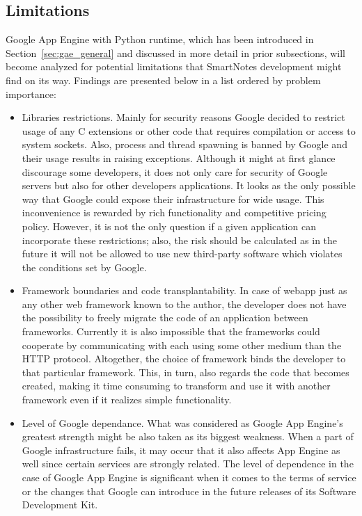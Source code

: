 \subsection{Limitations}\label{subsec:limitations}
Google App Engine with Python runtime, which has been introduced in Section~\ref{sec:gae_general} and discussed in more detail in prior subsections, will become analyzed for potential limitations that SmartNotes development might find on its way. Findings are presented below in a list ordered by problem importance:
\begin{itemize}
\item{Libraries restrictions. Mainly for security reasons Google decided to restrict usage of any C extensions or other code that requires compilation or access to system sockets. Also, process and thread spawning is banned by Google and their usage results in raising exceptions. Although it might at first glance discourage some developers, it does not only care for security of Google servers but also for other developers applications. It looks as the only possible way that Google could expose their infrastructure for wide usage. This inconvenience is rewarded by rich functionality and competitive pricing policy. However, it is not the only question if a given application can incorporate these restrictions; also, the risk should be calculated as in the future it will not be allowed to use new third-party software which violates the conditions set by Google.}
 
\item{Framework boundaries and code transplantability. In case of webapp just as any other web framework known to the author, the developer does not have the possibility to freely migrate the code of an application between frameworks. Currently it is also impossible that the frameworks could cooperate by communicating with each using some other medium than the HTTP protocol. Altogether, the choice of framework binds the developer to that particular framework. This, in turn, also regards the code that becomes created, making it time consuming to transform and use it with another framework even if it realizes simple functionality.}
 
\item{Level of Google dependance. What was considered as Google App Engine’s greatest strength might be also taken as its biggest weakness. When a part of Google infrastructure fails, it may occur that it also affects App Engine as well since certain services are strongly related. The level of dependence in the case of Google App Engine is significant when it comes to the terms of service or the changes that Google can introduce in the future releases of its Software Development Kit.}
 

\end{itemize}
